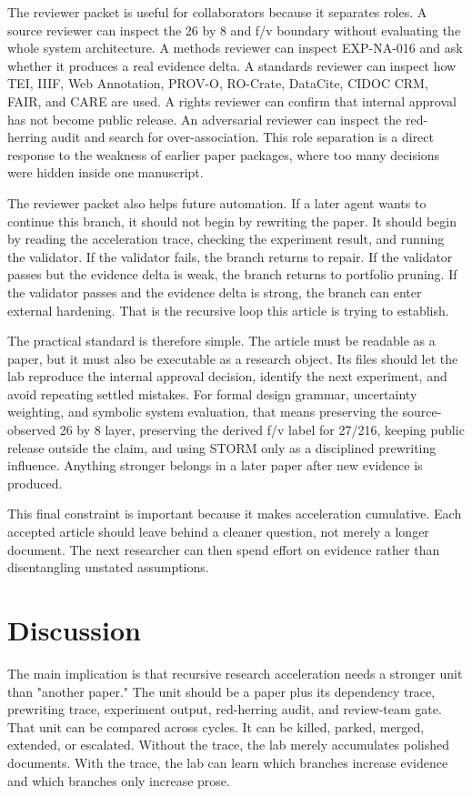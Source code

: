 \documentclass[sigconf,nonacm]{acmart}
\begin{document}
The reviewer packet is useful for collaborators because it separates roles. A
source reviewer can inspect the 26 by 8 and f/v boundary without evaluating the
whole system architecture. A methods reviewer can inspect EXP-NA-016 and ask
whether it produces a real evidence delta. A standards reviewer can inspect how
TEI, IIIF, Web Annotation, PROV-O, RO-Crate, DataCite, CIDOC CRM, FAIR, and CARE
are used. A rights reviewer can confirm that internal approval has not become
public release. An adversarial reviewer can inspect the red-herring audit and
search for over-association. This role separation is a direct response to the
weakness of earlier paper packages, where too many decisions were hidden inside
one manuscript.

The reviewer packet also helps future automation. If a later agent wants to
continue this branch, it should not begin by rewriting the paper. It should
begin by reading the acceleration trace, checking the experiment result, and
running the validator. If the validator fails, the branch returns to repair. If
the validator passes but the evidence delta is weak, the branch returns to
portfolio pruning. If the validator passes and the evidence delta is strong, the
branch can enter external hardening. That is the recursive loop this article is
trying to establish.

The practical standard is therefore simple. The article must be readable as a
paper, but it must also be executable as a research object. Its files should let
the lab reproduce the internal approval decision, identify the next experiment,
and avoid repeating settled mistakes. For formal design grammar, uncertainty weighting, and symbolic system evaluation, that means preserving the
source-observed 26 by 8 layer, preserving the derived f/v label for 27/216,
keeping public release outside the claim, and using STORM only as a disciplined
prewriting influence. Anything stronger belongs in a later paper after new
evidence is produced.

This final constraint is important because it makes acceleration cumulative.
Each accepted article should leave behind a cleaner question, not merely a
longer document. The next researcher can then spend effort on evidence rather
than disentangling unstated assumptions.


\section{Discussion}
The main implication is that recursive research acceleration needs a stronger
unit than "another paper." The unit should be a paper plus its dependency trace,
prewriting trace, experiment output, red-herring audit, and review-team gate.
That unit can be compared across cycles. It can be killed, parked, merged,
extended, or escalated. Without the trace, the lab merely accumulates polished
documents. With the trace, the lab can learn which branches increase evidence
and which branches only increase prose.
\end{document}
